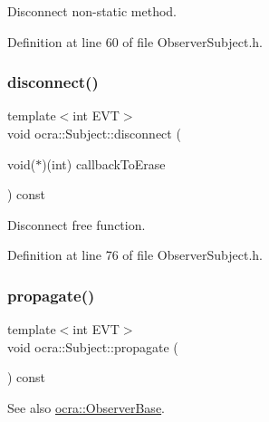 Disconnect non-\/static method. 



Definition at line 60 of file Observer\+Subject.\+h.

\hypertarget{classocra_1_1Subject_a0b00b12e5a125ff7e389887e5bcddfd3}{}\label{classocra_1_1Subject_a0b00b12e5a125ff7e389887e5bcddfd3} 
\subsubsection{\texorpdfstring{disconnect()}{disconnect()}\hspace{0.1cm}{\footnotesize\ttfamily [2/2]}}
{\footnotesize\ttfamily template$<$int E\+VT$>$ \\
void ocra\+::\+Subject\+::disconnect (\begin{DoxyParamCaption}\item[{void($\ast$)(int)}]{callback\+To\+Erase }\end{DoxyParamCaption}) const\hspace{0.3cm}{\ttfamily [inline]}}



Disconnect free function. 



Definition at line 76 of file Observer\+Subject.\+h.

\hypertarget{classocra_1_1Subject_ad8cfd92805c2c9444d09deda14b2dbc9}{}\label{classocra_1_1Subject_ad8cfd92805c2c9444d09deda14b2dbc9} 
\subsubsection{\texorpdfstring{propagate()}{propagate()}\hspace{0.1cm}{\footnotesize\ttfamily [1/2]}}
{\footnotesize\ttfamily template$<$int E\+VT$>$ \\
void ocra\+::\+Subject\+::propagate (\begin{DoxyParamCaption}{ }\end{DoxyParamCaption}) const\hspace{0.3cm}{\ttfamily [inline]}}

\begin{DoxySeeAlso}{See also}
\hyperlink{classocra_1_1ObserverBase}{ocra\+::\+Observer\+Base}. 
\end{DoxySeeAlso}


